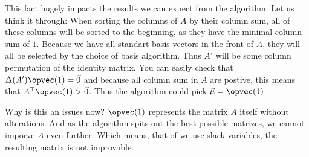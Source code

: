 This fact hugely impacts the results we can expect from the algorithm. Let us think it through: When sorting the columns of $A$ by their column sum, all of these columns will be sorted to the beginning, as they have the minimal column sum of $1$. Because we have all standart basis vectors in the front of $A$, they will all be selected by the choice of basis algorithm. Thus $A'$ will be some column permutation of the identity matrix. You can easily check that $\Delta(A')\opvec(1) = \vec 0$ and because all column sum in $A$ are postive, this means that $A^\top \opvec(1) > \vec 0$. Thus the algorithm could pick $\vec\mu = \opvec(1)$.

Why is this an issues now? $\opvec(1)$ represents the matrix $A$ itself without alterations. And as the algorithm spits out the best possible matrizes, we cannot imporve $A$ even further. Which means, that of we use slack variables, the resulting matrix is not improvable.